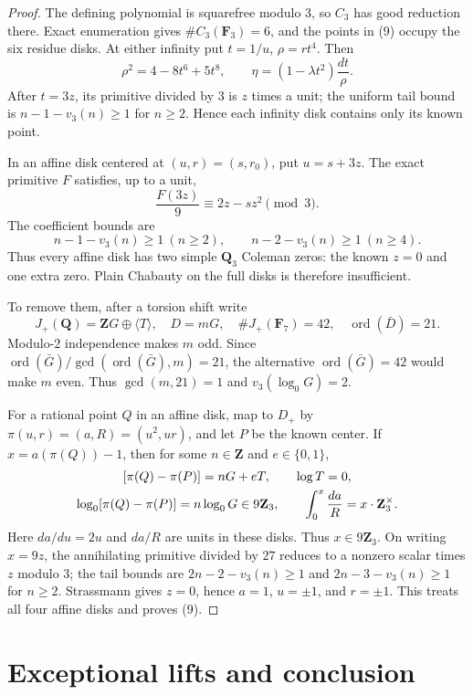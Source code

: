 \documentclass[11pt]{article}
\newcommand{\Q}{\mathbf Q}
\begin{document}
\begin{proof}
The defining polynomial is squarefree modulo \(3\), so \(C_3\) has good
reduction there.  Exact enumeration gives $\#C_3(\mathbf F_3)=6$, and the
points in (9) occupy the six residue disks.  At either infinity put
\(t=1/u\), \(\rho=rt^4\).  Then
\[
 \rho^2=4-8t^6+5t^8,\qquad
 \eta=(1-\lambda t^2)\frac{dt}{\rho}.
\]
After $t=3z$, its primitive divided by $3$ is $z$ times a unit; the
uniform tail bound is $n-1-v_3(n)\ge1$ for $n\ge2$.  Hence each infinity
disk contains only its known point.

In an affine disk centered at $(u,r)=(s,r_0)$, put $u=s+3z$.  The exact
primitive $F$ satisfies, up to a unit,
\[
 \frac{F(3z)}9\equiv2z-sz^2\pmod3.                 \tag{10}
\]
The coefficient bounds are
\[
 n-1-v_3(n)\ge1\ (n\ge2),\qquad
 n-2-v_3(n)\ge1\ (n\ge4).
\]
Thus every affine disk has two simple $\Q_3$ Coleman zeros: the known
$z=0$ and one extra zero.  Plain Chabauty on the full disks is therefore
insufficient.

To remove them, after a torsion shift write
\[
 J_+(\Q)=\mathbf ZG\oplus\langle T\rangle,\quad D=mG,\quad
 \#J_+(\mathbf F_7)=42,\quad\operatorname{ord}(\bar D)=21.
\]
Modulo-$2$ independence makes $m$ odd.  Since
\(\operatorname{ord}(\bar G)/\gcd(\operatorname{ord}(\bar G),m)=21\),
the alternative \(\operatorname{ord}(\bar G)=42\) would make \(m\) even.
Thus \(\gcd(m,21)=1\) and \(v_3(\log_0G)=2\).

For a rational point $Q$ in an affine disk, map to $D_+$ by
\(\pi(u,r)=(a,R)=(u^2,ur)\), and let $P$ be the known center.  If
$x=a(\pi(Q))-1$, then for some \(n\in\mathbf Z\) and \(e\in\{0,1\}\),
\[
\begin{gathered}
 \relax[\pi(Q)-\pi(P)]=nG+eT,\qquad \log T=0,\\
 \log_0[\pi(Q)-\pi(P)]=n\log_0G\in9\mathbf Z_3,\qquad
 \int_0^x\frac{da}{R}=x\cdot\mathbf Z_3^\times.
\end{gathered}
\]
Here \(da/du=2u\) and \(da/R\) are units in these disks.
Thus $x\in9\mathbf Z_3$.  On writing $x=9z$, the annihilating primitive
divided by $27$ reduces to a nonzero scalar times $z$ modulo $3$; the tail
bounds are \(2n-2-v_3(n)\ge1\) and \(2n-3-v_3(n)\ge1\) for \(n\ge2\).
Strassmann gives $z=0$, hence $a=1$, $u=\pm1$, and $r=\pm1$.  This treats
all four affine disks and proves (9).
\end{proof}

\section{Exceptional lifts and conclusion}
\end{document}

